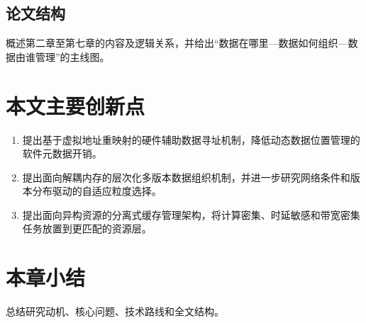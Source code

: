 \subsection{论文结构}
概述第二章至第七章的内容及逻辑关系，并给出“数据在哪里—数据如何组织—数据由谁管理”的主线图。

\section{本文主要创新点}
\begin{enumerate}
  \item 提出基于虚拟地址重映射的硬件辅助数据寻址机制，降低动态数据位置管理的软件元数据开销。
  \item 提出面向解耦内存的层次化多版本数据组织机制，并进一步研究网络条件和版本分布驱动的自适应粒度选择。
  \item 提出面向异构资源的分离式缓存管理架构，将计算密集、时延敏感和带宽密集任务放置到更匹配的资源层。
\end{enumerate}

\section{本章小结}
总结研究动机、核心问题、技术路线和全文结构。

